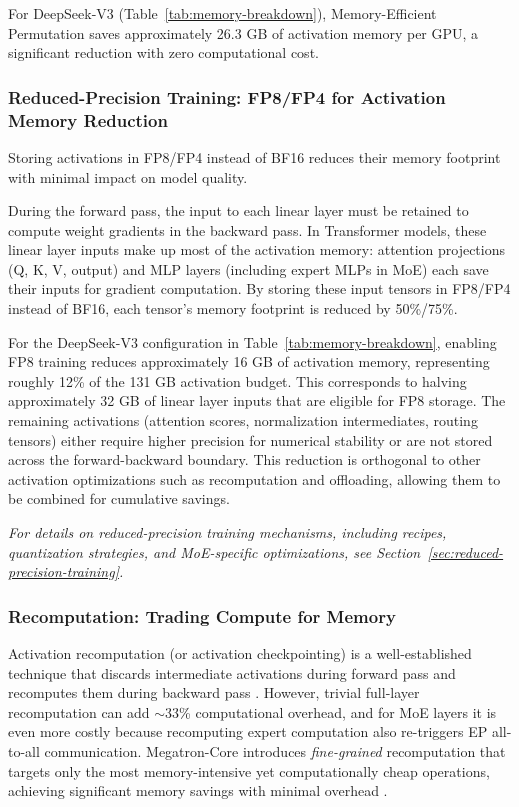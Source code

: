 For DeepSeek-V3 (Table~\ref{tab:memory-breakdown}), Memory-Efficient Permutation saves approximately 26.3 GB of activation memory per GPU, a significant reduction with zero computational cost.

\subsubsection{Reduced-Precision Training: FP8/FP4 for Activation Memory Reduction}\label{sec:fp8-activation}

Storing activations in FP8/FP4 instead of BF16 reduces their memory footprint with minimal impact on model quality.

During the forward pass, the input to each linear layer must be retained to compute weight gradients in the backward pass. In Transformer models, these linear layer inputs make up most of the activation memory: attention projections (Q, K, V, output) and MLP layers (including expert MLPs in MoE) each save their inputs for gradient computation. By storing these input tensors in FP8/FP4 instead of BF16, each tensor's memory footprint is reduced by 50\%/75\%.

For the DeepSeek-V3 configuration in Table~\ref{tab:memory-breakdown}, enabling FP8 training reduces approximately 16 GB of activation memory, representing roughly 12\% of the 131 GB activation budget. This corresponds to halving approximately 32 GB of linear layer inputs that are eligible for FP8 storage. The remaining activations (attention scores, normalization intermediates, routing tensors) either require higher precision for numerical stability or are not stored across the forward-backward boundary. This reduction is orthogonal to other activation optimizations such as recomputation and offloading, allowing them to be combined for cumulative savings.

\textit{For details on reduced-precision training mechanisms, including recipes, quantization strategies, and MoE-specific optimizations, see Section~\ref{sec:reduced-precision-training}.}

\subsubsection{Recomputation: Trading Compute for Memory}\label{sec:recomputation}

Activation recomputation (or activation checkpointing) is a well-established technique that discards intermediate activations during forward pass and recomputes them during backward pass \cite{chen2016training}. However, trivial full-layer recomputation can add $\sim$33\% computational overhead, and for MoE layers it is even more costly because recomputing expert computation also re-triggers EP all-to-all communication. Megatron-Core introduces \textit{fine-grained} recomputation that targets only the most memory-intensive yet computationally cheap operations, achieving significant memory savings with minimal overhead \cite{korthikanti2022reducingactivationrecomputationlarge}.


